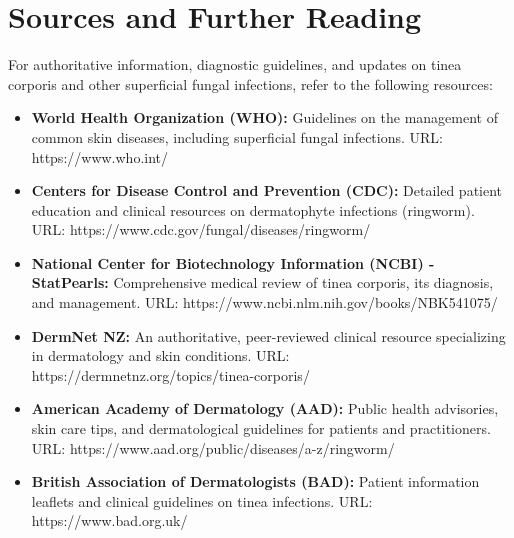 \section*{Sources and Further Reading}
For authoritative information, diagnostic guidelines, and updates on tinea corporis and other superficial fungal infections, refer to the following resources:
\begin{itemize}
    \item \textbf{World Health Organization (WHO):} Guidelines on the management of common skin diseases, including superficial fungal infections. URL: https://www.who.int/
    \item \textbf{Centers for Disease Control and Prevention (CDC):} Detailed patient education and clinical resources on dermatophyte infections (ringworm). URL: https://www.cdc.gov/fungal/diseases/ringworm/
    \item \textbf{National Center for Biotechnology Information (NCBI) - StatPearls:} Comprehensive medical review of tinea corporis, its diagnosis, and management. URL: https://www.ncbi.nlm.nih.gov/books/NBK541075/
    \item \textbf{DermNet NZ:} An authoritative, peer-reviewed clinical resource specializing in dermatology and skin conditions. URL: https://dermnetnz.org/topics/tinea-corporis/
    \item \textbf{American Academy of Dermatology (AAD):} Public health advisories, skin care tips, and dermatological guidelines for patients and practitioners. URL: https://www.aad.org/public/diseases/a-z/ringworm/
    \item \textbf{British Association of Dermatologists (BAD):} Patient information leaflets and clinical guidelines on tinea infections. URL: https://www.bad.org.uk/
\end{itemize}